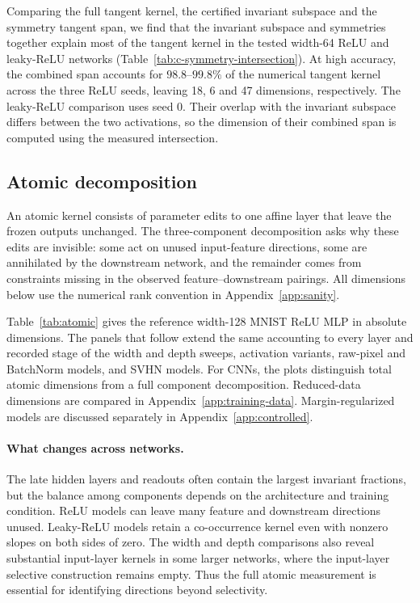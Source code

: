 Comparing the full tangent kernel, the certified invariant subspace and the symmetry tangent span, we find that the invariant subspace and symmetries together explain most of the tangent kernel in the tested width-64 ReLU and leaky-ReLU networks (Table~\ref{tab:c-symmetry-intersection}). At high accuracy, the combined span accounts for $98.8$--$99.8\%$ of the numerical tangent kernel across the three ReLU seeds, leaving 18, 6 and 47 dimensions, respectively. The leaky-ReLU comparison uses seed 0. Their overlap with the invariant subspace differs between the two activations, so the dimension of their combined span is computed using the measured intersection.

\subsection{Atomic decomposition}
\label{app:atomic}\label{app:mnist-cnn}
An atomic kernel consists of parameter edits to one affine layer that leave the frozen outputs unchanged. The three-component decomposition asks why these edits are invisible: some act on unused input-feature directions, some are annihilated by the downstream network, and the remainder comes from constraints missing in the observed feature--downstream pairings. All dimensions below use the numerical rank convention in Appendix~\ref{app:sanity}.

Table~\ref{tab:atomic} gives the reference width-128 MNIST ReLU MLP in absolute dimensions. The panels that follow extend the same accounting to every layer and recorded stage of the width and depth sweeps, activation variants, raw-pixel and BatchNorm models, and SVHN models. For CNNs, the plots distinguish total atomic dimensions from a full component decomposition. Reduced-data dimensions are compared in Appendix~\ref{app:training-data}. Margin-regularized models are discussed separately in Appendix~\ref{app:controlled}.
\begin{table}[!htbp]
\caption{Reference atomic decomposition: width-128, three-hidden-layer MNIST ReLU MLP on 10,000 analysis images, three seeds. At relative threshold $10^{-9}$, $\dim K_\ell$ is the sum of feature-null, downstream-null and co-occurrence dimensions. ``Dead'' counts units inactive on the analysis set; ``gap'' is the singular-value ratio at the reported rank.}\label{tab:atomic}
\centering{}
\end{table}
\FloatBarrier

\paragraph{What changes across networks.}
The late hidden layers and readouts often contain the largest invariant fractions, but the balance among components depends on the architecture and training condition. ReLU models can leave many feature and downstream directions unused. Leaky-ReLU models retain a co-occurrence kernel even with nonzero slopes on both sides of zero. The width and depth comparisons also reveal substantial input-layer kernels in some larger networks, where the input-layer selective construction remains empty. Thus the full atomic measurement is essential for identifying directions beyond selectivity.

